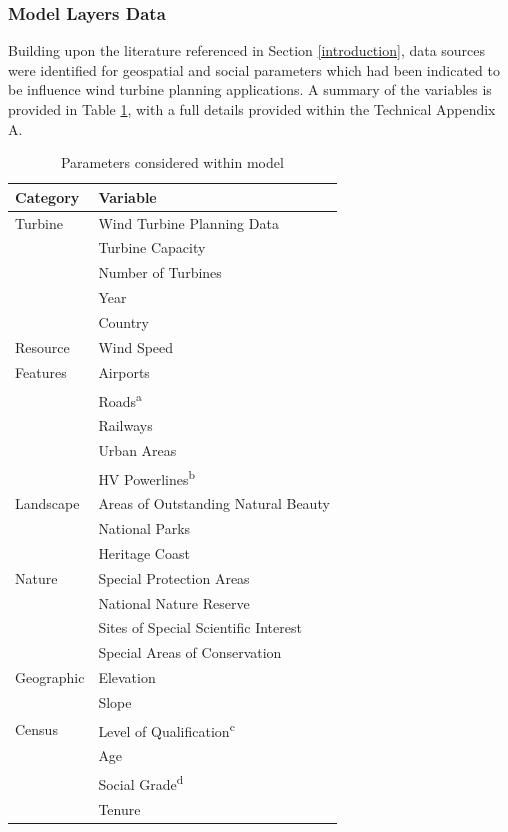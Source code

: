 \documentclass[a4paper,]{article}
\theoremstyle{definition}
\theoremstyle{definition}
\theoremstyle{definition}
\theoremstyle{remark}
\begin{document}
\subsubsection{Model Layers Data}\label{model-layers-data}

Building upon the literature referenced in Section \ref{introduction},
data sources were identified for geospatial and social parameters which
had been indicated to be influence wind turbine planning applications. A
summary of the variables is provided in Table \ref{tab:SummaryTable},
with a full details provided within the Technical Appendix A.

\begin{table}

\begin{threeparttable}
\caption{\label{tab:SummaryTable}Parameters considered within model}
\centering
\begin{tabular}[t]{ll}
\toprule
Category & Variable\\
\midrule
Turbine & Wind Turbine Planning Data\\
 & Turbine Capacity\\
 & Number of Turbines\\
 & Year\\
 & Country\\
Resource & Wind Speed\\
Features & Airports\\
 & Roads\textsuperscript{a}\\
 & Railways\\
 & Urban Areas\\
 & HV Powerlines\textsuperscript{b}\\
Landscape & Areas of Outstanding Natural Beauty\\
 & National Parks\\
 & Heritage Coast\\
Nature & Special Protection Areas\\
 & National Nature Reserve\\
 & Sites of Special Scientific Interest\\
 & Special Areas of Conservation\\
Geographic & Elevation\\
 & Slope\\
Census & Level of Qualification\textsuperscript{c}\\
 & Age\\
 & Social Grade\textsuperscript{d}\\
 & Tenure\\

\end{tabular}
\end{threeparttable}
\end{table}
\end{document}
